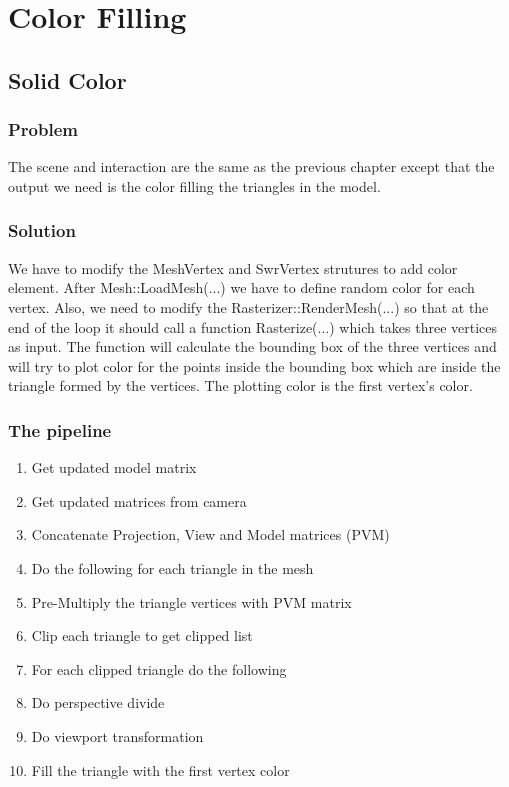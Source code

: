 \chapter{Color Filling}
\section{Solid Color}
\subsection{Problem}
The scene and interaction are the same as the previous chapter except that the output we need is the color filling the triangles in the model.
\subsection{Solution}
We have to modify the MeshVertex and SwrVertex strutures to add color element. After Mesh::LoadMesh(...) we have to define random color for each vertex. Also, we need to modify the Rasterizer::RenderMesh(...) so that at the end of the loop it should call a function Rasterize(...) which takes three vertices as input. The function will calculate the bounding box of the three vertices and will try to plot color for the points inside the bounding box which are inside the triangle formed by the vertices. The plotting color is the first vertex's color.
\subsection{The pipeline}
\begin{enumerate}
    \item Get updated model matrix
    \item Get updated matrices from camera
    \item Concatenate Projection, View and Model matrices (PVM)
    \item Do the following for each triangle in the mesh
    \item Pre-Multiply the triangle vertices with PVM matrix
    \item Clip each triangle to get clipped list
    \item For each clipped triangle do the following
    \item Do perspective divide
    \item Do viewport transformation
    \item Fill the triangle with the first vertex color
\end{enumerate}
